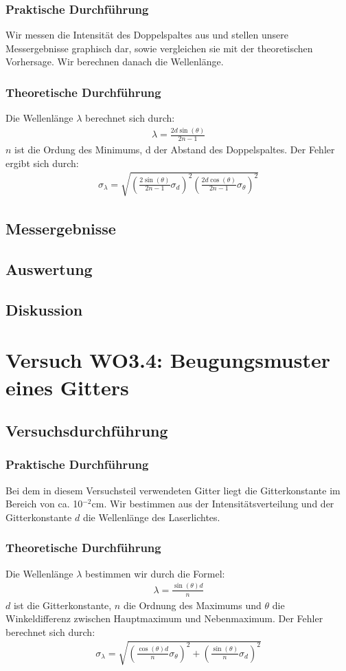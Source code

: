 \documentclass[12pt]{scrartcl}
\begin{document}
\subsubsection{Praktische Durchführung}
Wir messen die Intensität des Doppelspaltes aus und stellen unsere Messergebnisse graphisch dar, sowie vergleichen sie mit der theoretischen Vorhersage. Wir berechnen danach die Wellenlänge.
\subsubsection{Theoretische Durchführung}
Die Wellenlänge $\lambda$ berechnet sich durch:
\begin{align}
\lambda = \frac{2d \sin(\theta)}{2n-1}
\end{align}
$n$ ist die Ordung des Minimums, d der Abstand des Doppelspaltes.
Der Fehler ergibt sich durch:
\begin{align}
\sigma_\lambda = \sqrt{
\left(\frac{2 \sin(\theta)}{2n-1}\sigma_d\right)^2
\left(\frac{2d \cos(\theta)}{2n-1}\sigma_\theta\right)^2}
\end{align}
\subsection{Messergebnisse}
\subsection{Auswertung}
\subsection{Diskussion}

\section{Versuch WO3.4: Beugungsmuster eines Gitters}
\subsection{Versuchsdurchführung}

\subsubsection{Praktische Durchführung}
Bei dem in diesem Versuchsteil verwendeten Gitter liegt die Gitterkonstante im Bereich von ca. 10$^{-2}$cm. Wir bestimmen aus der Intensitätsverteilung und der Gitterkonstante $d$ die Wellenlänge des Laserlichtes.
\subsubsection{Theoretische Durchführung}
Die Wellenlänge $\lambda$ bestimmen wir durch die Formel:
\begin{align}
\lambda = \frac{\sin(\theta) d}{n}
\end{align}
$d$ ist die Gitterkonstante, $n$ die Ordnung des Maximums und $\theta$ die Winkeldifferenz zwischen Hauptmaximum und Nebenmaximum.
Der Fehler berechnet sich durch:
\begin{align}
\sigma_\lambda = \sqrt{
\left(\frac{\cos(\theta) d}{n}\sigma_\theta\right)^2+
\left(\frac{\sin(\theta)}{n}\sigma_d\right)^2}
\end{align} 
\end{document}
